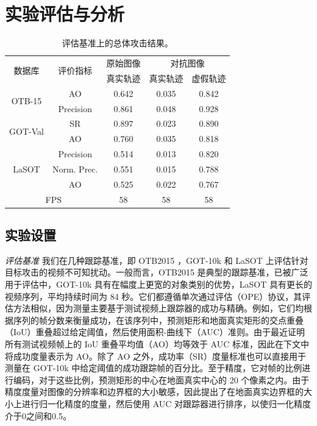 \section{实验评估与分析}

\begin{table}
\centering
\begin{tabular}{c c c c c}
\toprule
\multirow{2}{*}[-2pt]{数据库} & \multirow{2}{*}[-2pt]{评价指标} & 原始图像 & \multicolumn{2}{c}{对抗图像}  \\
\cmidrule(lr){3-3} \cmidrule(lr){4-5}
                          &                         & 真实轨迹 & 真实轨迹 & 虚假轨迹     \\ 
\midrule
\multirow{2}{*}{OTB-15} 
& AO   & 0.642 & 0.035 & 0.842\\
& Precision & 0.861 & 0.048 & 0.928\\
\midrule
\multirow{2}{*}{GOT-Val} 
& SR & 0.897 & 0.023 & 0.890\\
& AO 				   & 0.760 & 0.035 & 0.818 \\
\midrule
\multirow{3}{*}{LaSOT} 
& Precision       & 0.514 & 0.013 & 0.820\\
& Norm. Prec. & 0.551 & 0.015 & 0.788\\
& AO & 0.525 & 0.022 & 0.767\\
\midrule
\multicolumn{2}{c}{FPS} & 58 & 58 & 58\\
\bottomrule
\end{tabular}
\caption{评估基准上的总体攻击结果。}
\label{tab:benchmark results}
\end{table}

\subsection{实验设置}

\textit{评估基准} 我们在几种跟踪基准，即 OTB2015 \cite{OTB}，GOT-10k \cite{GOT-10k} 和 LaSOT \cite{LaSOT} 上评估针对目标攻击的视频不可知扰动。一般而言，OTB2015 是典型的跟踪基准，已被广泛用于评估中，GOT-10k 具有在幅度上更宽的对象类别的优势，LaSOT 具有更长的视频序列，平均持续时间为 84 秒。它们都遵循单次通过评估（OPE）协议，其评估方法相似，因为测量主要基于测试视频上跟踪器的成功与精确。例如，它们均根据序列的帧分数来衡量成功，在该序列中，预测矩形和地面真实矩形的交点重叠（IoU）重叠超过给定阈值，然后使用面积-曲线下（AUC）准则。由于最近证明所有测试视频帧上的 IoU 重叠平均值（AO）均等效于 AUC 标准，因此在下文中将成功度量表示为 AO。除了 AO 之外，成功率（SR）度量标准也可以直接用于测量在 GOT-10k 中给定阈值的成功跟踪帧的百分比。至于精度，它对帧的比例进行编码，对于这些比例，预测矩形的中心在地面真实中心的 20 个像素之内。由于精度度量对图像的分辨率和边界框的大小敏感，因此提出了在地面真实边界框的大小上进行归一化精度的度量，然后使用 AUC 对跟踪器进行排序，以使归一化精度介于0之间和0.5。

